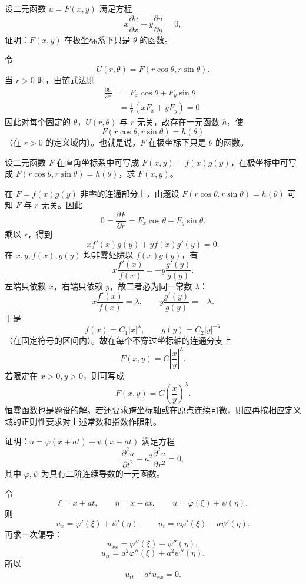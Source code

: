 \begin{xexercise}[9]
设二元函数 $u=F(x,y)$ 满足方程
  \[
    x\frac{\partial u}{\partial x}+y\frac{\partial u}{\partial y}=0,
  \]
  证明：$F(x,y)$ 在极坐标系下只是 $\theta$ 的函数。
\end{xexercise}
\begin{xsolution}
令
\[
  U(r,\theta)=F(r\cos\theta,r\sin\theta).
\]
当 $r>0$ 时，由链式法则
\begin{align*}
  \frac{\partial U}{\partial r}
  &=F_x\cos\theta+F_y\sin\theta\\
  &=\frac1r(xF_x+yF_y)=0.
\end{align*}
因此对每个固定的 $\theta$，$U(r,\theta)$ 与 $r$ 无关，故存在一元函数 $h$，使
\[
  \boxed{F(r\cos\theta,r\sin\theta)=h(\theta)}
\]
（在 $r>0$ 的定义域内）。也就是说，$F$ 在极坐标下只是 $\theta$ 的函数。
\end{xsolution}


\begin{xexercise}[10]
设二元函数 $F$ 在直角坐标系中可写成 $F(x,y)=f(x)g(y)$，在极坐标中可写成 $F(r\cos\theta,r\sin\theta)=h(\theta)$，求 $F(x,y)$。
\end{xexercise}
\begin{xsolution}
在 $F=f(x)g(y)$ 非零的连通部分上，由题设 $F(r\cos\theta,r\sin\theta)=h(\theta)$ 可知 $F$ 与 $r$ 无关。因此
\[
  0=\frac{\partial F}{\partial r}
  =F_x\cos\theta+F_y\sin\theta.
\]
乘以 $r$，得到
\[
  xf'(x)g(y)+yf(x)g'(y)=0.
\]
在 $x,y,f(x),g(y)$ 均非零处除以 $f(x)g(y)$，有
\[
  x\frac{f'(x)}{f(x)}
  =-y\frac{g'(y)}{g(y)}.
\]
左端只依赖 $x$，右端只依赖 $y$，故二者必为同一常数 $\lambda$：
\[
  x\frac{f'(x)}{f(x)}=\lambda,
  \qquad
  y\frac{g'(y)}{g(y)}=-\lambda.
\]
于是
\[
  f(x)=C_1|x|^\lambda,
  \qquad
  g(y)=C_2|y|^{-\lambda}
\]
（在固定符号的区间内）。故在每个不穿过坐标轴的连通分支上
\[
  \boxed{F(x,y)=C\left|\frac{x}{y}\right|^\lambda}.
\]
若限定在 $x>0,y>0$，则可写成
\[
  \boxed{F(x,y)=C\left(\frac{x}{y}\right)^\lambda}.
\]
恒零函数也是题设的解。若还要求跨坐标轴或在原点连续可微，则应再按相应定义域的正则性要求对上述常数和指数作限制。
\end{xsolution}


\begin{xexercise}[11]
证明：$u=\varphi(x+at)+\psi(x-at)$ 满足方程
  \[
    \frac{\partial^2u}{\partial t^2}-a^2\frac{\partial^2u}{\partial x^2}=0,
  \]
  其中 $\varphi,\psi$ 为具有二阶连续导数的一元函数。
\end{xexercise}
\begin{xsolution}
令
\[
  \xi=x+at,
  \qquad
  \eta=x-at,
  \qquad
  u=\varphi(\xi)+\psi(\eta).
\]
则
\[
  u_x=\varphi'(\xi)+\psi'(\eta),
  \qquad
  u_t=a\varphi'(\xi)-a\psi'(\eta).
\]
再求一次偏导：
\[
  u_{xx}=\varphi''(\xi)+\psi''(\eta),
\]
\[
  u_{tt}=a^2\varphi''(\xi)+a^2\psi''(\eta).
\]
所以
\[
  \boxed{u_{tt}-a^2u_{xx}=0}.
\]
\end{xsolution}


